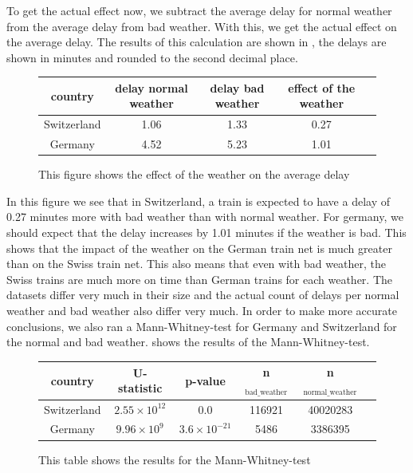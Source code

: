 To get the actual effect now, we subtract the average delay for normal weather from the average delay from bad weather.
With this, we get the actual effect on the average delay.
The results of this calculation are shown in , the delays are shown in minutes and rounded to the second decimal place.
\begin{figure}[!ht]
    \centering
    \begin{tabular}{|c|c|c|c|c|}
        \hline
        country & delay normal weather & delay bad weather & effect of the weather \\
        \hline
        Switzerland & 1.06 & 1.33 & 0.27 \\
        \hline
        Germany & 4.52 & 5.23 & 1.01 \\
        \hline
    \end{tabular}
    \caption{This figure shows the effect of the weather on the average delay}
    \label{fig:g5_weather_delay}
\end{figure}
In this figure we see that in Switzerland, a train is expected to have a delay of 0.27 minutes more with bad weather than with normal weather.
For germany, we should expect that the delay increases by 1.01 minutes if the weather is bad.
This shows that the impact of the weather on the German train net
is much greater than on the Swiss train net.
This also means that even with bad weather, the Swiss trains are much more on time than German trains
for each weather. \newline \newline
The datasets differ very much in their size and the actual count of delays per normal weather and bad weather also differ very much.
In order to make more accurate conclusions, we also ran a Mann-Whitney-test \cite{mann1947test} for Germany and Switzerland for the normal and bad weather.
 shows the results of the Mann-Whitney-test.
\begin{figure}[!ht]
    \centering
    \begin{tabular}{|c|c|c|c|c|c|}
        \hline
        country & U-statistic & p-value & n$_{\text{bad\_weather}}$ & n$_{\text{normal\_weather}}$\\
        \hline
        Switzerland & $2.55\times10^{12}$ & 0.0 & 116921 & 40020283\\
        \hline
        Germany & $9.96\times10^{9}$ & $3.6\times10^{-21}$ & 5486 & 3386395\\
        \hline
    \end{tabular}
    \caption{This table shows the results for the Mann-Whitney-test}
    \label{fig:g5_Mann_Whitney_test}
\end{figure}
